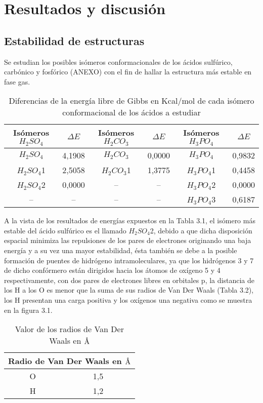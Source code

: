 \chapter{Resultados y discusión}

\section{Estabilidad de estructuras}

Se estudian los posibles isómeros conformacionales de los ácidos sulfúrico, carbónico y fosfórico (ANEXO) con el fin de hallar la estructura más estable en fase gas. \\

  \begin{table}[H]
\begin{center}
\begin{tabular}{|c|c|c|c|c|c|}
\hline
Isómeros $H_2SO_4$ & $\Delta E$ & Isómeros $H_2CO_3$ & $\Delta E$ & Isómeros $H_3PO_4$ & $\Delta E$ \\ \hline
$H_2SO_4$ & 4,1908 & $H_2CO_3$ & 0,0000 & $H_3PO_4$ & 0,9832 \\ \hline
$H_2SO_4$1 & 2,5058 & $H_2CO_3$1 & 1,3775 & $H_3PO_4$1 & 0,4458 \\ \hline
$H_2SO_4$2 & 0,0000 & -- & -- & $H_3PO_4$2 & 0,0000 \\ \hline
-- & -- & -- & -- & $H_3PO_4$3 & 0,6187 \\ \hline
\end{tabular}
\caption{Diferencias de la energía libre de Gibbs en Kcal/mol de cada isómero conformacional de los ácidos a estudiar}
\label{tab:3.1}
\end{center}
\end{table}
A la vista de los resultados de energías expuestos en la Tabla 3.1, el isómero más estable del ácido sulfúrico es el llamado $H_2SO_4$2, debido a que dicha disposición espacial minimiza las repulsiones de los pares de electrones originando una baja energía y a su vez una mayor estabilidad, ésta también se debe a la posible formación de puentes de hidrógeno intramoleculares, ya que los hidrógenos 3 y 7 de dicho confórmero están dirigidos hacia los átomos de oxígeno 5 y 4 respectivamente, con dos pares de electrones libres en orbitales p, la distancia de los H a los O es menor que la suma de sus radios de Van Der Waals (Tabla 3.2), los H presentan una carga positiva y los oxígenos una negativa como se muestra en la figura 3.1.
	\begin{table}[H]
\begin{center}
\begin{tabular}{|c|c|}
	\hline
	\multicolumn{2}{|c|}{Radio de Van Der Waals en $\mbox{\normalfont\AA}$} \\ \hline
	O & 1,5 \\ \hline
	H & 1,2 \\ \hline
\end{tabular}
\caption{Valor de los radios de Van Der Waals en $\mbox{\normalfont\AA}$}
\end{center}	
\end{table}
